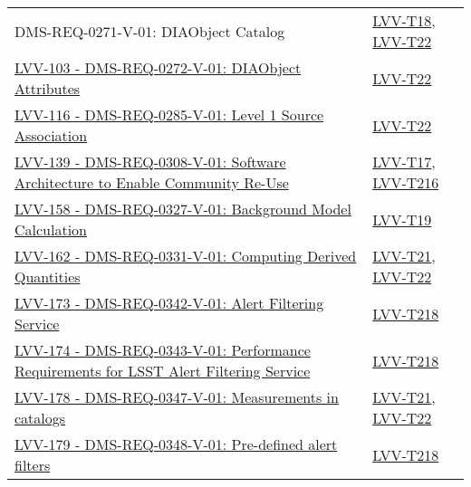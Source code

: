 \begin{longtable}[]{p{13cm}p{3cm}}
{DMS-REQ-0271-V-01: DIAObject Catalog} &
\protect\hyperlink{lvv-t18---ag-00-05-alert-generation-produces-required-data-products}{LVV-T18},
\protect\hyperlink{lvv-t22---ag-00-25-scientific-verification-of-diaobject-catalog}{LVV-T22}\tabularnewline
\href{https://jira.lsstcorp.org/browse/LVV-103}{LVV-103 -
DMS-REQ-0272-V-01: DIAObject Attributes} &
\protect\hyperlink{lvv-t22---ag-00-25-scientific-verification-of-diaobject-catalog}{LVV-T22}\tabularnewline
\href{https://jira.lsstcorp.org/browse/LVV-116}{LVV-116 -
DMS-REQ-0285-V-01: Level 1 Source Association} &
\protect\hyperlink{lvv-t22---ag-00-25-scientific-verification-of-diaobject-catalog}{LVV-T22}\tabularnewline
\href{https://jira.lsstcorp.org/browse/LVV-139}{LVV-139 -
DMS-REQ-0308-V-01: Software Architecture to Enable Community Re-Use} &
\protect\hyperlink{lvv-t17---ag-00-00-installation-of-the-alert-generation-science-payload}{LVV-T17},
\protect\hyperlink{lvv-t216---installation-of-the-alert-distribution-payloads}{LVV-T216}\tabularnewline
\href{https://jira.lsstcorp.org/browse/LVV-158}{LVV-158 -
DMS-REQ-0327-V-01: Background Model Calculation} &
\protect\hyperlink{lvv-t19---ag-00-10-scientific-verification-of-processed-visit-images}{LVV-T19}\tabularnewline
\href{https://jira.lsstcorp.org/browse/LVV-162}{LVV-162 -
DMS-REQ-0331-V-01: Computing Derived Quantities} &
\protect\hyperlink{lvv-t21---ag-00-20-scientific-verification-of-diasource-catalog}{LVV-T21},
\protect\hyperlink{lvv-t22---ag-00-25-scientific-verification-of-diaobject-catalog}{LVV-T22}\tabularnewline
\href{https://jira.lsstcorp.org/browse/LVV-173}{LVV-173 -
DMS-REQ-0342-V-01: Alert Filtering Service} &
\protect\hyperlink{lvv-t218---simple-filtering-of-the-lsst-alert-stream}{LVV-T218}\tabularnewline
\href{https://jira.lsstcorp.org/browse/LVV-174}{LVV-174 -
DMS-REQ-0343-V-01: Performance Requirements for LSST Alert Filtering
Service} &
\protect\hyperlink{lvv-t218---simple-filtering-of-the-lsst-alert-stream}{LVV-T218}\tabularnewline
\href{https://jira.lsstcorp.org/browse/LVV-178}{LVV-178 -
DMS-REQ-0347-V-01: Measurements in catalogs} &
\protect\hyperlink{lvv-t21---ag-00-20-scientific-verification-of-diasource-catalog}{LVV-T21},
\protect\hyperlink{lvv-t22---ag-00-25-scientific-verification-of-diaobject-catalog}{LVV-T22}\tabularnewline
\href{https://jira.lsstcorp.org/browse/LVV-179}{LVV-179 -
DMS-REQ-0348-V-01: Pre-defined alert filters} &
\protect\hyperlink{lvv-t218---simple-filtering-of-the-lsst-alert-stream}{LVV-T218}\tabularnewline
\bottomrule
\end{longtable}


